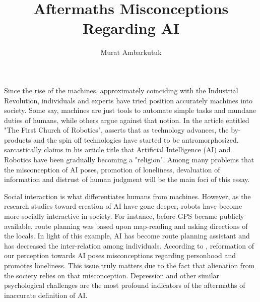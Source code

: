 \documentclass[man]{apa6}
\title{Aftermaths Misconceptions Regarding AI}
\author{Murat Ambarkutuk}
\affiliation{English Language Institute, University of Delaware \\ murata@udel.edu}
\begin{document}
\maketitle
Since the rise of the machines, approximately coinciding with the Industrial Revolution, individuals and experts have tried position accurately machines into society. Some say, machines are just tools to automate simple tasks and mundane duties of humans, while others argue against that notion. In the article entitled "The First Church of Robotics",  asserts that as technology advances, the by-products and the spin off technologies have started to be antromorphosized.  sarcastically claims in his article title that Artificial Intelligence (AI)  and Robotics have been gradually becoming a "religion". Among many problems that the misconception of AI poses, promotion of loneliness, devaluation of information and distrust of human judgment will be the main foci of this essay.\par
Social interaction is what differentiates humans from machines. However, as the research studies toward creation of AI have gone deeper, robots have become more socially interactive in society. For instance, before GPS became publicly available, route planning was based upon map-reading and asking directions of the locals. In light of this example, AI has become route planning assistant and has decreased the inter-relation among individuals. According to , reformation of our perception towards AI poses misconceptions regarding personhood and promotes loneliness. This issue truly matters due to the fact that alienation from the society relies on that misconception. Depression and other similar psychological challenges are the most profound indicators of the aftermaths of inaccurate definition of AI.\par



\end{document}
